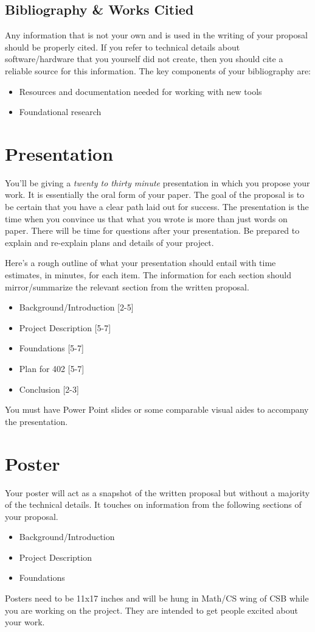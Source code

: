 \documentclass[10pt]{article}
\begin{document}
\subsection{Bibliography \& Works Citied}

Any information that is not your own and is used in the writing of your proposal should be properly cited.  If you refer to technical details about software/hardware that you yourself did not create, then you should cite a reliable source for this information.  The key components of your bibliography are: 
\begin{itemize}
\item Resources and documentation needed for working with new tools
\item Foundational research
\end{itemize}

\section{Presentation}

You'll be giving a \textit{twenty to thirty minute} presentation in which you propose your work. It is essentially the oral form of your paper. The goal of the proposal is to be certain that you have a clear path laid out for success.  The presentation is the time when you convince us that what you wrote is more than just words on paper. There will be time for questions after your presentation. Be prepared to explain and re-explain plans and details of your project.  

Here's a rough outline of what your presentation should entail with time estimates, in minutes, for each item.  The information for each section should mirror/summarize the relevant section from the written proposal. 
\begin{itemize}
\item Background/Introduction [2-5]
\item Project Description [5-7]
\item Foundations [5-7]
\item Plan for 402 [5-7]
\item Conclusion [2-3]
\end{itemize}

You must have Power Point slides or some comparable visual aides to accompany the presentation.

\section{Poster}

Your poster will act as a snapshot of the written proposal but without a majority of the technical details.  It touches on information from the following sections of your proposal.
\begin{itemize}
\item Background/Introduction
\item Project Description
\item Foundations
\end{itemize}
Posters need to be 11x17 inches and will be hung in Math/CS wing of CSB while you are working on the project. They are intended to get people excited about your work.
\end{document}
